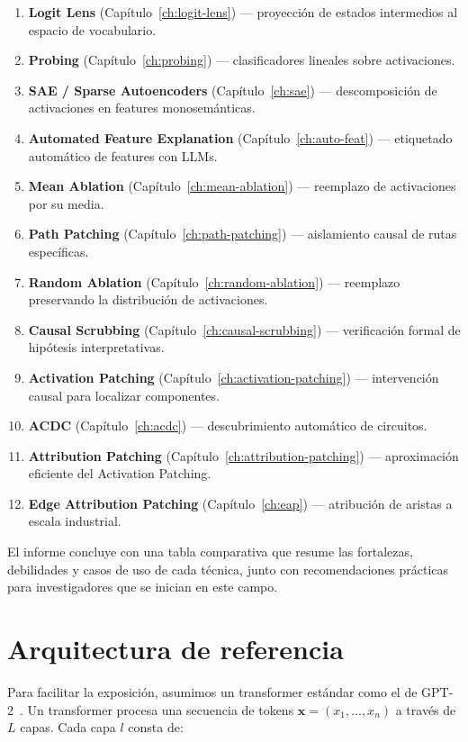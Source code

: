 \documentclass[11pt,a4paper]{report}
\theoremstyle{definition}
\begin{document}
\begin{enumerate}
    \item \textbf{Logit Lens} (Capítulo~\ref{ch:logit-lens}) --- proyección de estados intermedios al espacio de vocabulario.
    \item \textbf{Probing} (Capítulo~\ref{ch:probing}) --- clasificadores lineales sobre activaciones.
    \item \textbf{SAE / Sparse Autoencoders} (Capítulo~\ref{ch:sae}) --- descomposición de activaciones en features monosemánticas.
    \item \textbf{Automated Feature Explanation} (Capítulo~\ref{ch:auto-feat}) --- etiquetado automático de features con LLMs.
    \item \textbf{Mean Ablation} (Capítulo~\ref{ch:mean-ablation}) --- reemplazo de activaciones por su media.
    \item \textbf{Path Patching} (Capítulo~\ref{ch:path-patching}) --- aislamiento causal de rutas específicas.
    \item \textbf{Random Ablation} (Capítulo~\ref{ch:random-ablation}) --- reemplazo preservando la distribución de activaciones.
    \item \textbf{Causal Scrubbing} (Capítulo~\ref{ch:causal-scrubbing}) --- verificación formal de hipótesis interpretativas.
    \item \textbf{Activation Patching} (Capítulo~\ref{ch:activation-patching}) --- intervención causal para localizar componentes.
    \item \textbf{ACDC} (Capítulo~\ref{ch:acdc}) --- descubrimiento automático de circuitos.
    \item \textbf{Attribution Patching} (Capítulo~\ref{ch:attribution-patching}) --- aproximación eficiente del Activation Patching.
    \item \textbf{Edge Attribution Patching} (Capítulo~\ref{ch:eap}) --- atribución de aristas a escala industrial.
\end{enumerate}

El informe concluye con una tabla comparativa que resume las fortalezas, debilidades y casos de uso de cada técnica, junto con recomendaciones prácticas para investigadores que se inician en este campo.

\section{Arquitectura de referencia}

Para facilitar la exposición, asumimos un transformer estándar como el de GPT-2~\cite{radford2019language}. Un transformer procesa una secuencia de tokens $\mathbf{x} = (x_1, \dots, x_n)$ a través de $L$ capas. Cada capa $l$ consta de:
\end{document}
